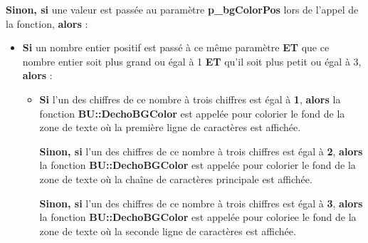 \documentclass[a4paper,10pt]{article}
\begin{document}
\begin{justify}
    \textbf{\color{brick}Sinon, si} une valeur est passée au paramètre \textbf{\color{orange}p\_bgColorPos} lors de l'appel de la fonction, \textbf{\color{brick}alors} :\par
\end{justify}

\begin{itemize}
    \item
    {
        \begin{justify}
            \textbf{\color{brick}Si} un nombre entier positif est passé à ce même paramètre \textbf{ET} que ce nombre entier soit plus grand ou égal à 1 \textbf{ET} qu'il soit plus petit ou égal à 3, \textbf{\color{brick}alors} :
        \end{justify}\setlength{\parskip}{1em}

        \begin{itemize}
            \item
            {
                \begin{justify}
                    \textbf{\color{brick}Si} l'un des chiffres de ce nombre à trois chiffres est égal à \textbf{1}, \textbf{\color{brick}alors} la fonction \textbf{\color{mauve}BU::DechoBGColor} est appelée pour colorier le fond de la zone de texte où la première ligne de caractères est affichée.
                \end{justify}\setlength{\parskip}{1em}
                
                \begin{justify}
                    \textbf{\color{brick}Sinon, si} l'un des chiffres de ce nombre à trois chiffres est égal à \textbf{2}, \textbf{\color{brick}alors} la fonction \textbf{\color{mauve}BU::DechoBGColor} est appelée pour colorier le fond de la zone de texte où la chaîne de caractères principale est affichée.
                \end{justify}\setlength{\parskip}{1em}

                \begin{justify}
                    \textbf{\color{brick}Sinon, si} l'un des chiffres de ce nombre à trois chiffres est égal à \textbf{3}, \textbf{\color{brick}alors} la fonction \textbf{\color{mauve}BU::DechoBGColor} est appelée pour coloriee le fond de la zone de texte où la seconde ligne de caractères est affichée.
                \end{justify}\setlength{\parskip}{1em}
                
}
\end{itemize}}
\end{itemize}
\end{document}
